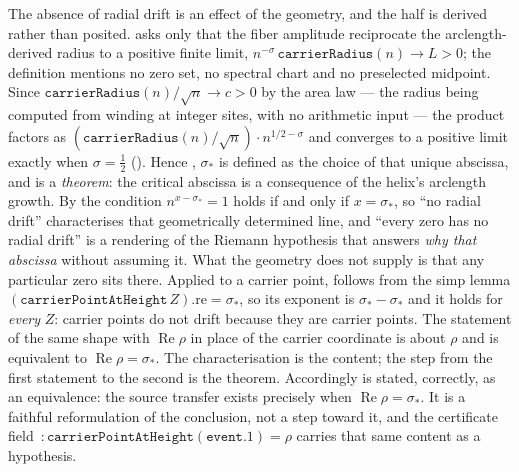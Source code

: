 \documentclass[11pt]{article}
\theoremstyle{definition}
\renewcommand{\Re}{\operatorname{Re}}
\begin{document}
The absence of radial drift is an effect of the geometry, and the half is
derived rather than posited.  asks only that the
fiber amplitude reciprocate the arclength-derived radius to a positive finite
limit, \(n^{-\sigma}\,\texttt{carrierRadius}(n)\to L>0\); the definition
mentions no zero set, no spectral chart and no preselected midpoint. Since
\(\texttt{carrierRadius}(n)/\sqrt n\to c>0\) by the area law --- the radius
being computed from winding at integer sites, with no arithmetic input --- the
product factors as \((\texttt{carrierRadius}(n)/\sqrt n)\cdot n^{1/2-\sigma}\)
and converges to a positive limit exactly when \(\sigma=\tfrac12\)
(). Hence
, \(\sigma_*\) is defined as the
choice of that unique abscissa, and  is a
\emph{theorem}: the critical abscissa is a consequence of the helix's
arclength growth. By  the condition
\(n^{x-\sigma_*}=1\) holds if and only if \(x=\sigma_*\), so ``no radial
drift'' characterises that geometrically determined line, and ``every zero has
no radial drift'' is a rendering of the Riemann hypothesis that answers
\emph{why that abscissa} without assuming it. What the geometry does not
supply is that any particular zero sits there. Applied to a carrier point,
 follows from the simp lemma
\(({\texttt{carrierPointAtHeight}}\,Z).\mathrm{re}=\sigma_*\), so its exponent
is \(\sigma_*-\sigma_*\) and it holds for \emph{every} \(Z\): carrier points
do not drift because they are carrier points. The statement of the same shape
with \(\Re\rho\) in place of the carrier coordinate is about \(\rho\) and is
equivalent to \(\Re\rho=\sigma_*\). The characterisation is the content; the
step from the first statement to the second is the theorem. Accordingly
 is
stated, correctly, as an equivalence: the source transfer exists precisely
when \(\Re\rho=\sigma_*\). It is a faithful reformulation of the conclusion,
not a step toward it, and the certificate field
\,:\,\(\texttt{carrierPointAtHeight}(\texttt{event}.1)
=\rho\) carries that same content as a hypothesis.
\end{document}
